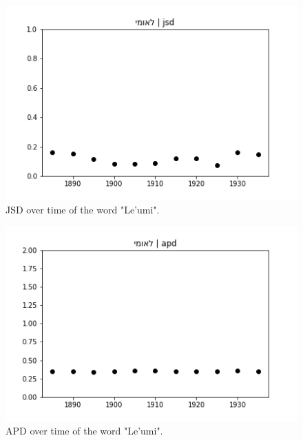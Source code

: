 \documentclass[10pt, a4paper]{article}
\begin{document}
\begin{figure}[!h]
\begin{center}
\includegraphics[scale=0.5]{LREC_PAPER/leumi/לאומי_jsd.png}
\caption{JSD over time of the word "Le'umi".}
\label{fig.3}
\end{center}
\end{figure}
\begin{figure}[!h]
\begin{center}
\includegraphics[scale=0.5]{LREC_PAPER/leumi/לאומי_apd.png}
\caption{APD over time of the word "Le'umi".}
\label{fig.4}
\end{center}
\end{figure}
\end{document}
